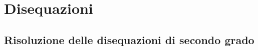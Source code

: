 
%   

% 
%   

% 

\begin{comment}
 
 \begin{minipage}{.45\textwidth}
  
 \end{minipage}
 \begin{minipage}{.25\textwidth}
  
 \end{minipage}
 \begin{minipage}{.3\textwidth}
  
 \end{minipage}
 
\end{comment}

\chapter{Disequazioni}

\section{Risoluzione delle disequazioni di secondo grado}
\label{sec:diseq_secondo_grado}

